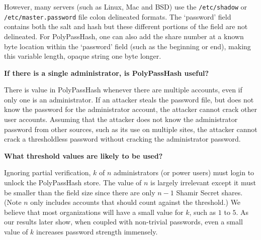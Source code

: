 However, 
many servers (such as Linux, Mac and BSD) use the {\tt /etc/shadow} or 
{\tt /etc/master.password} file 
colon delineated formats.
The `password' field contains both the salt and hash but these
different portions of the field are not 
delineated.  
For PolyPassHash, one can also add the share number at a known byte location
within the `password' field (such as the beginning or end), making this
variable length, opaque string one byte longer.


{\bf If there is a single administrator, is PolyPassHash useful?}

There is value in PolyPassHash whenever there are multiple
accounts, even if only one is an administrator.   If an attacker steals the
password file, but does not know the password for the administrator account, 
the attacker cannot crack other user accounts.   
Assuming that the attacker does not know the administrator password
from other sources, such as its use on multiple sites, the 
attacker cannot crack a thresholdless password without cracking 
the administrator password.


{\bf What threshold values are likely to be used?}

Ignoring partial verification,
$k$ of $n$ administrators (or power users) must login to unlock the
PolyPassHash store.   The value of $n$ is largely irrelevant
except it must be smaller than the field size since there are only $n-1$ 
Shamir Secret shares.   (Note $n$ only includes accounts that should count
against the threshold.)
%
We believe that most organizations will have a small 
value for $k$, such as $1$ to $5$.   As our results later show, 
when coupled with non-trivial passwords, even a small value of $k$ 
increases password strength immensely.



